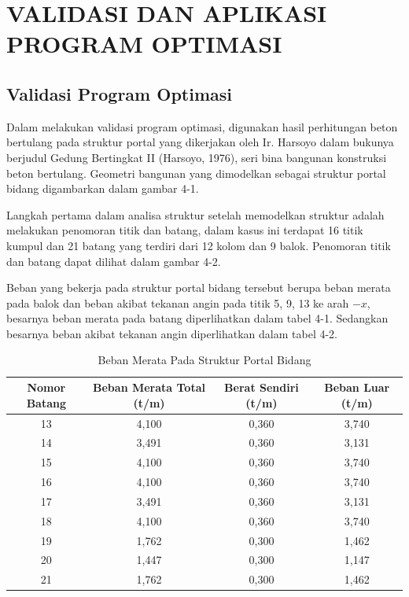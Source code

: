 \chapter{VALIDASI DAN APLIKASI PROGRAM OPTIMASI}
\label{bab:validasi}

\section{Validasi Program Optimasi}

Dalam melakukan validasi program optimasi, digunakan hasil perhitungan
beton bertulang pada struktur portal yang dikerjakan oleh Ir. Harsoyo
dalam bukunya berjudul Gedung Bertingkat II (Harsoyo, 1976), seri bina
bangunan konstruksi beton bertulang. Geometri bangunan yang dimodelkan
sebagai struktur portal bidang digambarkan dalam gambar 4-1.


Langkah pertama dalam analisa struktur setelah memodelkan struktur adalah
melakukan penomoran titik dan batang, dalam kasus ini terdapat 16 titik
kumpul dan 21 batang yang terdiri dari 12 kolom dan 9 balok. Penomoran
titik dan batang dapat dilihat dalam gambar 4-2.


Beban yang bekerja pada struktur portal bidang tersebut berupa beban
merata pada balok dan beban akibat tekanan angin pada titik 5, 9, 13 ke
arah $-x$, besarnya beban merata pada batang diperlihatkan dalam tabel
4-1. Sedangkan besarnya beban akibat tekanan angin diperlihatkan dalam
tabel 4-2.

\begin{table}[htbp]
\centering
\caption{Beban Merata Pada Struktur Portal Bidang}
\label{tab:4-1}
\begin{tabular}{cccc}
\toprule
Nomor Batang & Beban Merata Total (t/m) & Berat Sendiri (t/m) & Beban Luar (t/m) \\
\midrule
13 & 4,100 & 0,360 & 3,740 \\
14 & 3,491 & 0,360 & 3,131 \\
15 & 4,100 & 0,360 & 3,740 \\
16 & 4,100 & 0,360 & 3,740 \\
17 & 3,491 & 0,360 & 3,131 \\
18 & 4,100 & 0,360 & 3,740 \\
19 & 1,762 & 0,300 & 1,462 \\
20 & 1,447 & 0,300 & 1,147 \\
21 & 1,762 & 0,300 & 1,462 \\
\bottomrule
\end{tabular}
\end{table}

